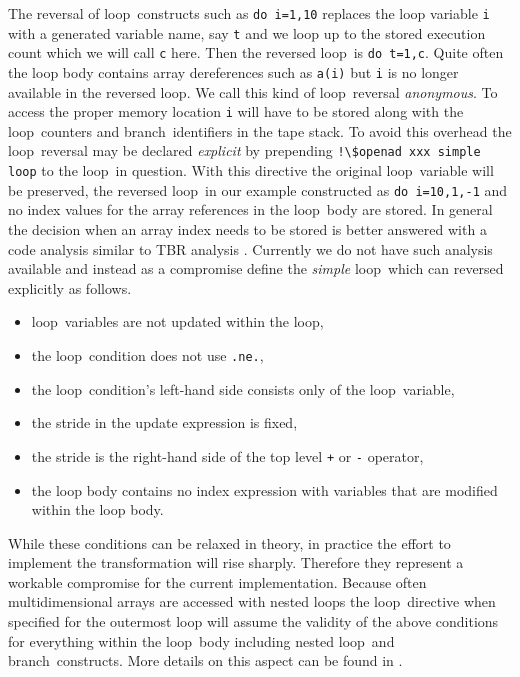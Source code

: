 \documentclass{book}
\newcommand{\Loop}{loop}
\newcommand{\branch}{branch}
\begin{document}
The reversal of  \Loop\ constructs such as \lstinline{do i=1,10} replaces 
the loop variable \lstinline{i} with a generated variable name, say \lstinline{t} and we 
loop up to  the stored execution count which we will call  \lstinline{c} here. 
Then the reversed \Loop\ is \lstinline{do t=1,c}. Quite often the loop body contains 
array dereferences such as \lstinline{a(i)} but \lstinline{i} is no longer available in the 
reversed \Loop. We call this kind of \Loop\ reversal {\em anonymous}. 
To access the proper memory location \lstinline{i} will have to be stored along with the 
\Loop\ counters and \branch\ identifiers in the tape stack.
To avoid this overhead the \Loop\ reversal may be declared {\em explicit}
by prepending \lstinline{!\$openad xxx simple loop} to the \Loop\ in question. 
With this directive the original \Loop\ variable will be preserved,  
the reversed \Loop\ in our example constructed as \lstinline{do i=10,1,-1} and 
no index values for the array references in the \Loop\ body are stored. 
In general the decision when an array index needs to be stored is better answered 
with a code analysis similar to TBR analysis \cite{HNP02}. 
Currently we do not have such  analysis available and instead 
as a compromise define the {\em simple}
\Loop\ which can reversed explicitly as follows. 
\begin{itemize}
  \parskip = -2pt
\item \Loop\ variables are not updated within the loop,
\item the \Loop\ condition does not use \lstinline{.ne.},
\item the \Loop\ condition's left-hand side consists only of the \Loop\ variable,
\item the stride in the update expression is fixed,
\item the stride is the right-hand side of the top level \lstinline{+} or \lstinline{-} operator,
\item the loop body contains no index expression with variables that are modified within the loop body.
\end{itemize}
While these conditions can be relaxed in theory, in practice the effort to implement 
the transformation will rise sharply. Therefore they represent a workable compromise 
for the current implementation. 
Because often multidimensional arrays  are accessed with nested loops the 
\Loop\ directive when specified for the outermost loop will assume the validity 
of the above conditions for everything within the \Loop\ body including nested 
\Loop\ and \branch\ constructs. More details on this aspect can be found in 
\cite{UtLy05ERIF}. 
\end{document}

